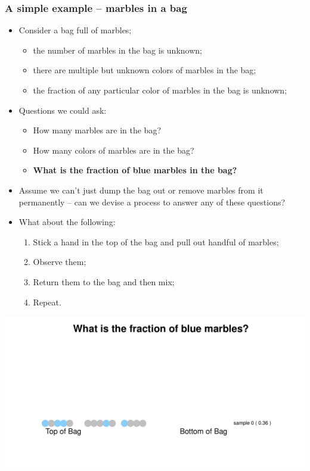 \documentclass[aspectratio=169]{beamer}
\theoremstyle{principle}
\begin{document}
\begin{frame}
\frametitle{A simple example -- marbles in a bag}

\begin{itemize}
\item Consider a bag full of marbles;
\begin{itemize}
\item the number of marbles in the bag is unknown;
\item there are multiple but unknown colors of marbles in the bag;
\item the fraction of any particular color of marbles in the bag is unknown;
\end{itemize}
\bigskip
\item Questions we could ask:
\begin{itemize}
\item How many marbles are in the bag?
\item How many colors of marbles are in the bag?
\item \textbf{What is the fraction of blue marbles in the bag?}
\end{itemize}
\bigskip
\item Assume we can't just dump the bag out or remove marbles from it permanently -- can we devise a process to answer any of these questions?
\bigskip
\item What about the following:
\begin{enumerate}
\item Stick a hand in the top of the bag and pull out handful of marbles;
\item Observe them;
\item Return them to the bag and then mix;
\item Repeat.
\end{enumerate} 
\end{itemize}

\end{frame}

\begin{frame}
\begin{center}
\includegraphics[scale=0.57]{sample_0.pdf}
\end{center}
\end{frame}
\end{document}
